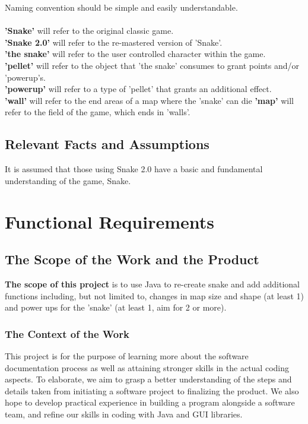 \documentclass[12pt, titlepage]{article}
\begin{document}
Naming convention should be simple and easily understandable. \\\\
\textbf{'Snake'} will refer to the original classic game.\\
\textbf{'Snake 2.0'} will refer to the re-mastered version of 'Snake'.\\
\textbf{'the snake'} will refer to the user controlled character within the game.\\
\textbf{'pellet'} will refer to the object that 'the snake' consumes to grant points and/or 'powerup's.\\
\textbf{'powerup'} will refer to a type of 'pellet' that grants an additional effect.\\
\textbf{'wall'} will refer to the end areas of a map where the 'snake' can die
\textbf{'map'} will refer to the field of the game, which ends in 'walls'. \\


\subsection{Relevant Facts and Assumptions}

It is assumed that those using Snake 2.0 have a basic and fundamental understanding of the game, Snake. 

\section{Functional Requirements}

\subsection{The Scope of the Work and the Product}

\textbf{The scope of this project} is to use Java to re-create snake and add additional functions including, but not limited to, changes in map size and shape (at least 1) and power ups for the 'snake' (at least 1, aim for 2 or more).

\subsubsection{The Context of the Work}

This project is for the purpose of learning more about the software documentation process as well as attaining stronger skills in the actual coding aspects. To elaborate, we aim to grasp a better understanding of the steps and details taken from initiating a software project to finalizing the product. We also hope to develop practical experience in building a program alongside a software team, and refine our skills in coding with Java and GUI libraries.
\end{document}
